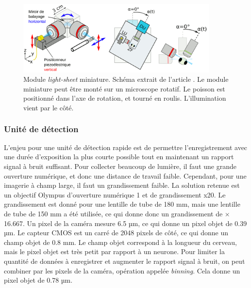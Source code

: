 \begin{figure}[b]
    \centering
    \includegraphics[width=0.9\textwidth]{./files/miniature_light-sheet.svg.png}
    \caption{Module \emph{light-sheet} miniature. Schéma extrait de l'article \cite{migault_whole-brain_2018}. Le module miniature peut être monté sur un microscope rotatif. Le poisson est positionné dans l'axe de rotation, et tourné en roulis. L'illumination vient par le côté.
    \label{FIGminiaturelightsheet}}
    \end{figure}

\subsubsection{Unité de détection}

L'enjeu pour une unité de détection rapide est de permettre l'enregistrement avec une durée d'exposition la plus courte possible tout en maintenant un rapport signal à bruit suffisant. Pour collecter beaucoup de lumière, il faut une grande ouverture numérique, et donc une distance de travail faible. Cependant, pour une imagerie à champ large, il faut un grandissement faible. La solution retenue est un objectif Olympus d'ouverture numérique 1 et de grandissement x20. Le grandissement est donné pour une lentille de tube de 180 mm, mais une lentille de tube de 150 mm a été utilisée, ce qui donne donc un grandissement de $\times$16.667. Un pixel de la caméra mesure 6.5 µm, ce qui donne un pixel objet de 0.39 µm. Le capteur CMOS est un carré de 2048 pixels de côté, ce qui donne un champ objet de 0.8 mm. Le champ objet correspond à la longueur du cerveau, mais le pixel objet est très petit par rapport à un neurone. Pour limiter la quantité de données à enregistrer et augmenter le rapport signal à bruit, on peut combiner par les pixels de la caméra, opération appelée \emph{binning}. Cela donne un pixel objet de 0.78 µm.


